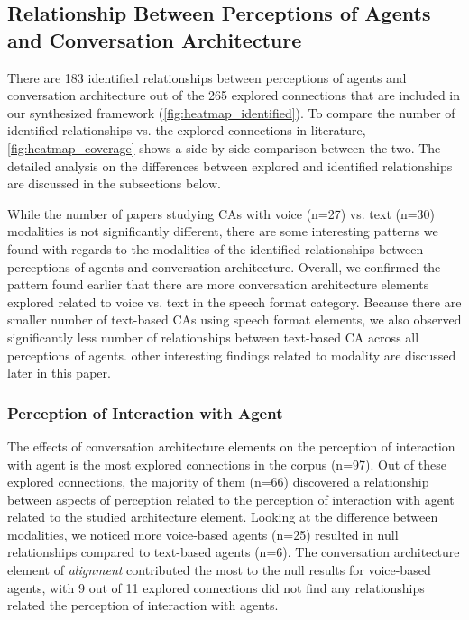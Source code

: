 \subsection{Relationship Between Perceptions of Agents and Conversation Architecture}

There are 183 identified relationships between perceptions of agents and conversation architecture out of the 265 explored connections that are included in our synthesized framework (\autoref{fig:heatmap_identified}). To compare the number of identified relationships vs. the explored connections in literature, \autoref{fig:heatmap_coverage} shows a side-by-side comparison between the two. The detailed analysis on the differences between explored and identified relationships are discussed in the subsections below.

While the number of papers studying CAs with voice (n=27) vs. text (n=30) modalities is not significantly different, there are some interesting patterns we found with regards to the modalities of the identified relationships between perceptions of agents and conversation architecture. Overall, we confirmed the pattern found earlier that there are more conversation architecture elements explored related to voice vs. text in the speech format category. Because there are smaller number of text-based CAs using speech format elements, we also observed significantly less number of relationships between text-based CA across all perceptions of agents. other interesting findings related to modality are discussed later in this paper.



\subsubsection{Perception of Interaction with Agent}

The effects of conversation architecture elements on the perception of interaction with agent is the most explored connections in the corpus (n=97). Out of these explored connections, the majority of them (n=66) discovered a relationship between aspects of perception related to the perception of interaction with agent related to the studied architecture element. Looking at the difference between modalities, we noticed more voice-based agents (n=25) resulted in null relationships compared to text-based agents (n=6). The conversation architecture element of \textit{alignment} contributed the most to the null results for voice-based agents, with 9 out of 11 explored connections did not find any relationships related the perception of interaction with agents.

